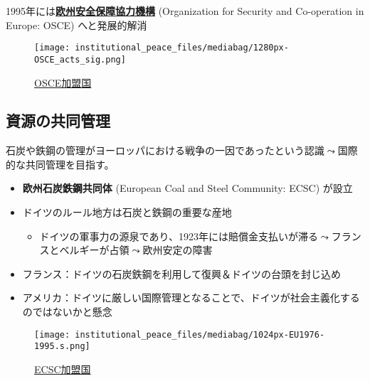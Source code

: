 \documentclass[
  xelatex,
  ja=standard]{bxjsarticle}
\providecommand{\tightlist}{%
  \setlength{\itemsep}{0pt}\setlength{\parskip}{0pt}}\usepackage{longtable,booktabs,array}
\begin{document}
1995年には\href{https://www.mofa.go.jp/mofaj/area/osce/gaiyo.html}{\textbf{欧州安全保障協力機構}}
(Organization for Security and Co-operation in Europe: OSCE)
へと発展的解消

\begin{figure}[htpb]

{\centering \texttt{[image: institutional\_peace\_files/mediabag/1280px-OSCE\_acts\_sig.png]}

}

\caption{\href{https://commons.wikimedia.org/wiki/File:OSCE_acts_signatories.png}{OSCE加盟国}}

\end{figure}

\hypertarget{ux8cc7ux6e90ux306eux5171ux540cux7ba1ux7406}{%
\subsection{資源の共同管理}\label{ux8cc7ux6e90ux306eux5171ux540cux7ba1ux7406}}

石炭や鉄鋼の管理がヨーロッパにおける戦争の一因であったという認識\(\leadsto\)国際的な共同管理を目指す。

\begin{itemize}
\tightlist
\item
  \textbf{欧州石炭鉄鋼共同体} (European Coal and Steel Community: ECSC)
  が設立
\item
  ドイツのルール地方は石炭と鉄鋼の重要な産地

  \begin{itemize}
  \tightlist
  \item
    ドイツの軍事力の源泉であり、1923年には賠償金支払いが滞る\(\leadsto\)フランスとベルギーが占領\(\leadsto\)欧州安定の障害
  \end{itemize}
\item
  フランス：ドイツの石炭鉄鋼を利用して復興＆ドイツの台頭を封じ込め
\item
  アメリカ：ドイツに厳しい国際管理となることで、ドイツが社会主義化するのではないかと懸念
\end{itemize}

\begin{figure}[htpb]

{\centering \texttt{[image: institutional\_peace\_files/mediabag/1024px-EU1976-1995.s.png]}

}

\caption{\href{https://commons.wikimedia.org/wiki/File:EU1976-1995.svg}{ECSC加盟国}}

\end{figure}
\end{document}

